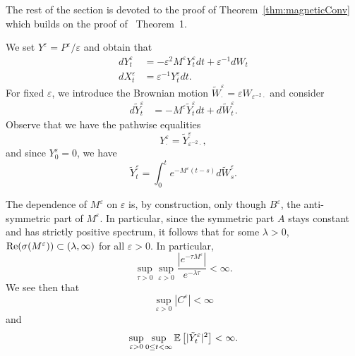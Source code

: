 \documentclass{article}
\begin{document}
The rest of the section is devoted to the proof of Theorem~\ref{thm:magneticConv} which builds on the proof of~\cite{FrizGassiat15} Theorem~1.

We set $Y^\varepsilon = P^\varepsilon/\varepsilon$ and obtain that
\begin{align*}
dY^\varepsilon_t &= -\varepsilon^2 M^\varepsilon Y^\varepsilon_t dt + \varepsilon^{-1}dW_t \\
dX^\varepsilon_t &= \varepsilon^{-1}Y^\varepsilon_t dt.
\end{align*}
For fixed $\varepsilon$, we introduce the Brownian motion $\tilde W^\varepsilon_\cdot = \varepsilon W_{\varepsilon^{-2} \cdot}$ and consider
\begin{align*}
d\tilde Y^\varepsilon_t &= -M^\varepsilon\tilde Y^\varepsilon_t dt + d\tilde W^\varepsilon_t.
\end{align*}
Observe that we have the pathwise equalities
\begin{equation}\label{eq:pathwiseEq}
Y^\varepsilon_\cdot = \tilde Y^\varepsilon_{\varepsilon^{-2}\cdot},
\end{equation}
and since $Y^\varepsilon_0 = 0$, we have
\begin{equation}\label{eq:YSol}
\tilde Y^\varepsilon_t = \int_0^t e^{-M^\varepsilon (t-s)} d\tilde W^\varepsilon_s.
\end{equation}


The dependence of $M^\varepsilon$ on $\varepsilon$ is, by construction, only though $B^\varepsilon$, the anti-symmetric part of $M^\varepsilon$. In particular, since the symmetric part $A$ stays constant and has strictly positive spectrum, it follows that for some $\lambda > 0$, $\Real(\sigma(M^\varepsilon)) \subset (\lambda,\infty)$ for all $\varepsilon > 0$. In particular,
\begin{equation}\label{eq:expBound}
\sup_{\tau > 0} \sup_{\varepsilon > 0} \frac{|e^{-\tau M^\varepsilon}|}{e^{-\lambda \tau}} < \infty.
\end{equation}
We see then that
\[
\sup_{\varepsilon > 0} |C^\varepsilon| < \infty
\]
and
\begin{equation}\label{YtildeL2}
\sup_{\varepsilon > 0} \sup_{0 \leq t < \infty} \EEE{|\tilde Y^\varepsilon_t|^2} < \infty.
\end{equation}
\end{document}
